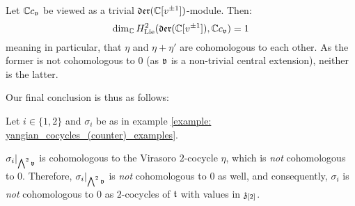        \begin{lemma} \label{lemma: uniqueness_of_virasoro_cocycle}
            \cite[Proposition 1.3]{kac_raina_rozhkovskaya_bombay_lectures_on_highest_weight_modules_of_infinite_dimensional_lie_algebras} Let $\mathbb{C} c_{\mathfrak{v}}$ be viewed as a trivial $\mathfrak{der}(\mathbb{C}[v^{\pm 1}])$-module. Then:
                $$\dim_{\mathbb{C}} H^2_{\mathrm{Lie}}( \mathfrak{der}(\mathbb{C}[v^{\pm 1}]), \mathbb{C} c_{\mathfrak{v}} ) = 1$$
            meaning in particular, that $\eta$ and $\eta + \eta'$ are cohomologous to each other. As the former is not cohomologous to $0$ (as $\mathfrak{v}$ is a non-trivial central extension), neither is the latter.
        \end{lemma}
        Our final conclusion is thus as follows:
        \begin{theorem}
            Let $i \in \{1, 2\}$ and $\sigma_i$ be as in example \ref{example: yangian_cocycles_(counter)_examples}.
        
            $\sigma_i|_{ \bigwedge^2 \mathfrak{v} }$ is cohomologous to the Virasoro $2$-cocycle $\eta$, which is \textit{not} cohomologous to $0$. Therefore, $\sigma_i|_{ \bigwedge^2 \mathfrak{v} }$ is \textit{not} cohomologous to $0$ as well, and consequently, $\sigma_i$ is \textit{not} cohomologous to $0$ as $2$-cocycles of $\mathfrak{t}$ with values in $\mathfrak{z}_{[2]}$.
        \end{theorem}